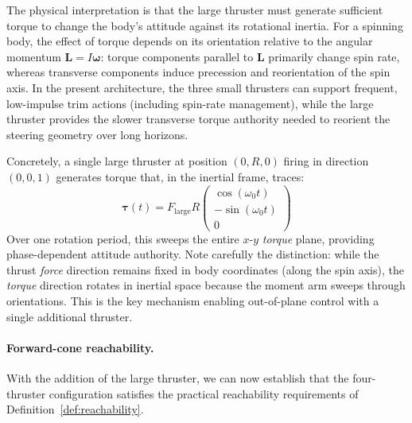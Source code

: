 \documentclass{article}
\begin{document}
The physical interpretation is that the large thruster must generate sufficient torque to change the body's attitude against its rotational inertia. For a spinning body, the effect of torque depends on its orientation relative to the angular momentum $\mathbf{L}=I\boldsymbol{\omega}$: torque components parallel to $\mathbf{L}$ primarily change spin rate, whereas transverse components induce precession and reorientation of the spin axis. In the present architecture, the three small thrusters can support frequent, low-impulse trim actions (including spin-rate management), while the large thruster provides the slower transverse torque authority needed to reorient the steering geometry over long horizons.

Concretely, a single large thruster at position $(0, R, 0)$ firing in direction $(0, 0, 1)$ generates torque that, in the inertial frame, traces:
\begin{equation}
    \bm{\tau}(t) = F_{\text{large}} R \begin{pmatrix} \cos(\omega_0 t) \\ -\sin(\omega_0 t) \\ 0 \end{pmatrix}
\end{equation}
Over one rotation period, this sweeps the entire $x$-$y$ \emph{torque} plane, providing phase-dependent attitude authority. Note carefully the distinction: while the thrust \emph{force} direction remains fixed in body coordinates (along the spin axis), the \emph{torque} direction rotates in inertial space because the moment arm sweeps through orientations. This is the key mechanism enabling out-of-plane control with a single additional thruster.

\paragraph{Forward-cone reachability.}
With the addition of the large thruster, we can now establish that the four-thruster configuration satisfies the practical reachability requirements of Definition~\ref{def:reachability}.
\end{document}
